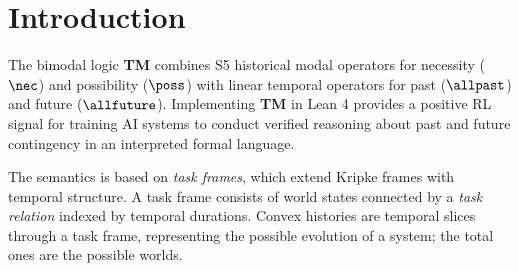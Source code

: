 \documentclass[../BimodalReference.tex]{subfiles}
\begin{document}
\section{Introduction}

The bimodal logic \textbf{TM} combines S5 historical modal operators for necessity ($\nec$) and possibility ($\poss$) with linear temporal operators for past ($\allpast$) and future ($\allfuture$).
Implementing \textbf{TM} in Lean 4 provides a positive RL signal for training AI systems to conduct verified reasoning about past and future contingency in an interpreted formal language.

The semantics is based on \emph{task frames}, which extend Kripke frames with temporal structure.
A task frame consists of world states connected by a \emph{task relation} indexed by temporal durations.
Convex histories are temporal slices through a task frame, representing the possible evolution of a system; the total ones are the possible worlds.
\end{document}
